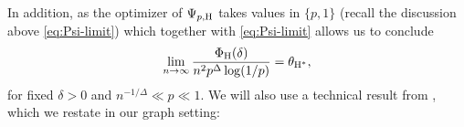 \documentclass[a4paper,11pt,english,reqno]{amsart}
\numberwithin{equation}{section}
\renewcommand{\leq}{\leqslant}
\newcommand{\uH}{\textup{H}}
\newcommand{\set}[1]{[\![#1]\!]}
\newcommand{\purple}[1]{{\color{purple} #1}}
\begin{document}
	In addition, as the optimizer of $\Psi_{p,\uH}$ takes values in $\{p,1\}$ (recall the discussion above \eqref{eq:Psi-limit}) %
	which together with \eqref{eq:Psi-limit} allows us to conclude  
%	
	\begin{equation}
		\label{limit:variational problem}
		\lim_{n\rightarrow \infty}\frac{\Phi_{\uH}(\delta)}{n^{2}p^{\Delta}\log(1/p)} = \theta_{\uH^{*}},
	\end{equation}
	for fixed $\delta>0$ and $n^{-1/\Delta} \ll p \ll 1$.
	We will also use a technical result from \cite{HMS}, which we restate in our graph setting:
\end{document}
